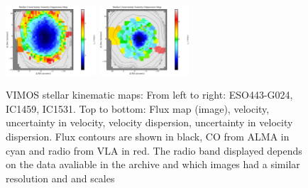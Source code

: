 \begin{figure}
      \includegraphics[width=0.3\textwidth]{chapter4/Vmaps/ic1459_stellar_sigma_uncert.png}
      \includegraphics[width=0.3\textwidth]{chapter4/Vmaps/ic1531_stellar_sigma_uncert.png}
      \\
      \caption[VIMOS stellar kinematic maps]{VIMOS stellar kinematic maps: From left to right: ESO443-G024, IC1459, IC1531. Top to bottom: Flux map (image), velocity, uncertainty in velocity, velocity dispersion, uncertainty in velocity dispersion. Flux contours are shown in black, CO from ALMA in cyan and radio from VLA in red. The radio band displayed depends on the data avaliable in the archive and which images had a similar resolution and and scales}
      \label{fig:VIMOS_stellar}
\end{figure}

